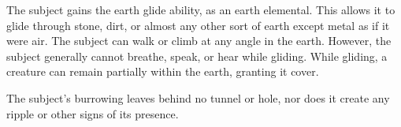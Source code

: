 \spelldur{\durshort}
\begin{spelleffect}
    The subject gains the earth glide ability, as an earth elemental. This allows it to glide through stone, dirt, or almost any other sort of earth except metal  as if it were air. The subject can walk or climb at any angle in the earth. However, the subject generally cannot breathe, speak, or hear while gliding. While gliding, a creature can remain partially within the earth, granting it cover.
\end{spelleffect}
\begin{spellnotes}
    The subject's burrowing leaves behind no tunnel or hole, nor does it create any ripple or other signs of its presence.
\end{spellnotes}


